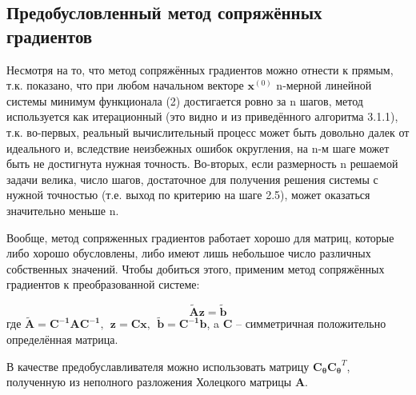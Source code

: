 \subsection{Предобусловленный метод сопряжённых градиентов}
Несмотря на то, что метод сопряжённых градиентов можно отнести к прямым, т.к. показано, что при любом начальном векторе $\mathbf{x}^{(0)}$ n-мерной линейной системы минимум функционала (2) достигается ровно за n шагов, метод используется как итерационный (это видно и из приведённого алгоритма 3.1.1), т.к. во-первых, реальный вычислительный процесс может быть довольно далек от идеального и, вследствие неизбежных ошибок округления, на n-м шаге может быть не достигнута нужная точность. Во-вторых, если размерность n решаемой задачи велика, число шагов, достаточное для получения решения системы с нужной точностью (т.е. выход по критерию на шаге 2.5), может оказаться значительно меньше n.

Вообще, метод сопряженных градиентов работает хорошо для матриц, которые либо хорошо обусловлены, либо имеют лишь небольшое число различных собственных значений. Чтобы добиться этого, применим метод сопряжённых градиентов к преобразованной системе:

\begin{equation}
    \mathbf{\tilde{A}z=\tilde{b}}
\end{equation}
где $\mathbf{\tilde{A} = C^{-1}AC^{-1}, ~~z = Cx,~~ \tilde{b} = C^{-1}b}$, a $\mathbf{C}$ -- симметричная положительно определённая матрица.

В качестве предобуславливателя можно использовать матрицу $\mathbf{C_\theta C_\theta}^T$, полученную из неполного разложения Холецкого матрицы $\mathbf{A}$.


